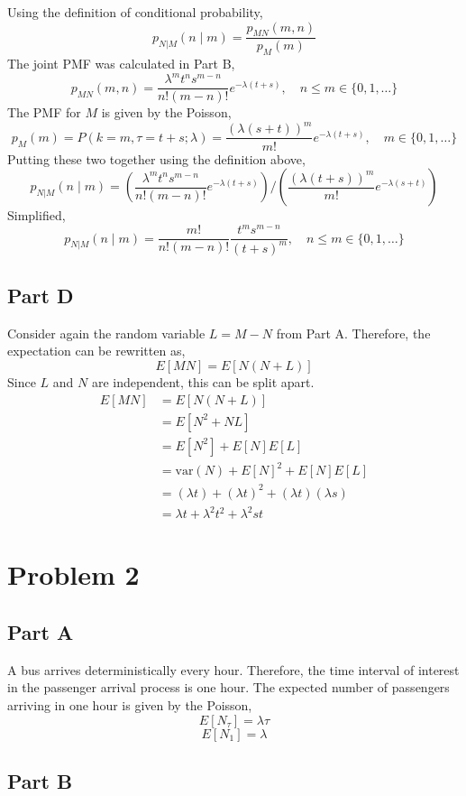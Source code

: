 \documentclass{article}
\begin{document}
Using the definition of conditional probability,
$$ p_{N|M}(n \mid m) = \frac{p_{MN}(m, n)}{p_M(m)} $$
The joint PMF was calculated in Part B,
$$ p_{MN}(m, n) = \frac{\lambda^m t^n s^{m - n}}{n!(m - n)!} e^{-\lambda(t +
s)},\quad n \leq m \in \{0, 1, \ldots\} $$
The PMF for $M$ is given by the Poisson,
$$ p_M(m) = P(k = m, \tau = t + s; \lambda) = \frac{\left(\lambda (s +
t)\right)^m}{m!} e^{-\lambda (t + s)},\quad m \in \{0, 1, \ldots\} $$
Putting these two together using the definition above,
$$ p_{N|M}(n \mid m) = \left(\frac{\lambda^m t^n s^{m - n}}{n!(m - n)!}
e^{-\lambda(t + s)}\right) / \left(\frac{\left(\lambda (t + s)\right)^m}{m!}
e^{-\lambda (s + t)}\right) $$
Simplified,
$$ p_{N|M}(n \mid m) = \frac{m!}{n! (m - n)!} \frac{t^m s^{m - n}}{(t +
s)^m},\quad n \leq m \in \{0, 1, \ldots\} $$

\subsection*{Part D}

Consider again the random variable $L = M - N$ from Part A. Therefore, the
expectation can be rewritten as,
$$ E[MN] = E[N (N + L)] $$
Since $L$ and $N$ are independent, this can be split apart.
\begin{align*}
  E[MN] &= E[N (N + L)] \\
  &= E[N^2 + NL] \\
  &= E[N^2] + E[N]E[L] \\
  &= \mathrm{var}(N) + E[N]^2 + E[N]E[L] \\
  &= (\lambda t) + (\lambda t)^2 + (\lambda t)(\lambda s) \\
  &= \lambda t + \lambda^2 t^2 + \lambda^2 s t
\end{align*}

\section*{Problem 2}

\subsection*{Part A}

A bus arrives deterministically every hour. Therefore, the time interval of
interest in the passenger arrival process is one hour. The expected number of
passengers arriving in one hour is given by the Poisson,
$$ E[N_\tau] = \lambda \tau $$
$$ E[N_1] = \lambda $$

\subsection*{Part B}
\end{document}
